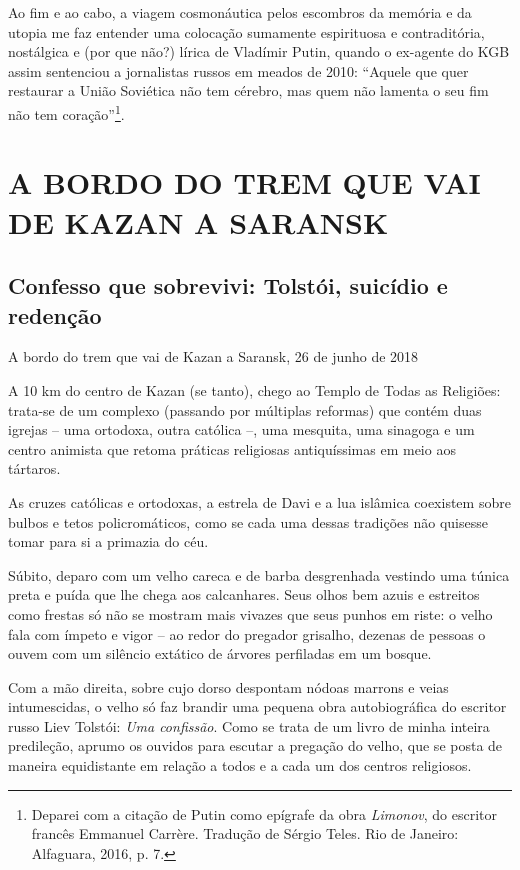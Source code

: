 Ao fim e ao cabo, a viagem cosmonáutica pelos escombros da memória e da
utopia me faz entender uma colocação sumamente espirituosa e
contraditória, nostálgica e (por que não?) lírica de Vladímir Putin,
quando o ex-agente do KGB assim sentenciou a jornalistas russos em
meados de 2010: ``Aquele que quer restaurar a União Soviética não tem
cérebro, mas quem não lamenta o seu fim não tem coração''\footnote{Deparei
  com a citação de Putin como epígrafe da obra \emph{Limonov}, do
  escritor francês Emmanuel Carrère. Tradução de Sérgio Teles. Rio de
  Janeiro: Alfaguara, 2016, p. 7.}.

\part{A BORDO DO TREM QUE VAI DE KAZAN A SARANSK}

\chapter*{Confesso que sobrevivi: Tolstói, suicídio e redenção}

\begin{flushright}
A bordo do trem que vai de Kazan a Saransk, 26 de junho de 2018
\end{flushright}

A 10 km do centro de Kazan (se tanto), chego ao Templo de Todas as
Religiões: trata-se de um complexo (passando por múltiplas reformas) que
contém duas igrejas -- uma ortodoxa, outra católica --, uma mesquita,
uma sinagoga e um centro animista que retoma práticas religiosas
antiquíssimas em meio aos tártaros.

As cruzes católicas e ortodoxas, a estrela de Davi e a lua islâmica
coexistem sobre bulbos e tetos policromáticos, como se cada uma dessas
tradições não quisesse tomar para si a primazia do céu.

Súbito, deparo com um velho careca e de barba desgrenhada vestindo uma
túnica preta e puída que lhe chega aos calcanhares. Seus olhos bem azuis
e estreitos como frestas só não se mostram mais vivazes que seus punhos
em riste: o velho fala com ímpeto e vigor -- ao redor do pregador
grisalho, dezenas de pessoas o ouvem com um silêncio extático de árvores
perfiladas em um bosque.

Com a mão direita, sobre cujo dorso despontam nódoas marrons e veias
intumescidas, o velho só faz brandir uma pequena obra autobiográfica do
escritor russo Liev Tolstói: \emph{Uma confissão}. Como se trata de um
livro de minha inteira predileção, aprumo os ouvidos para escutar a
pregação do velho, que se posta de maneira equidistante em relação a
todos e a cada um dos centros religiosos.

